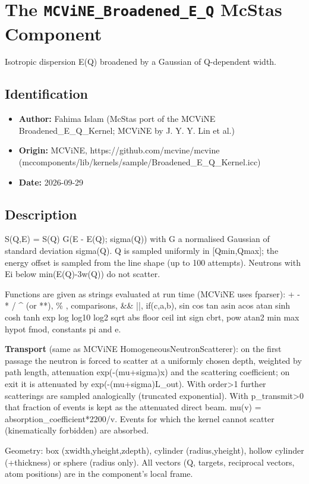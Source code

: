 \section{The \texttt{MCViNE\_Broadened\_E\_Q} McStas Component}
Isotropic dispersion E(Q) broadened by a Gaussian of Q-dependent width.

\subsection*{Identification}
\begin{itemize}
  \item \textbf{Author:} Fahima Islam (McStas port of the MCViNE Broadened\_E\_Q\_Kernel; MCViNE by J. Y. Y. Lin et al.)
  \item \textbf{Origin:} MCViNE, https://github.com/mcvine/mcvine (mccomponents/lib/kernels/sample/Broadened\_E\_Q\_Kernel.icc)
  \item \textbf{Date:} 2026-09-29
\end{itemize}

\subsection*{Description}
S(Q,E) = S(Q) G(E - E(Q); sigma(Q)) with G a normalised Gaussian of standard deviation sigma(Q). Q is sampled uniformly in [Qmin,Qmax]; the energy offset is sampled from the line shape (up to 100 attempts). Neutrons with Ei below min(E(Q)-3w(Q)) do not scatter.

Functions are given as strings evaluated at run time (MCViNE uses fparser): + - * / \textasciicircum{} (or **), \% , comparisons, \&\& ||, if(c,a,b), sin cos tan asin acos atan sinh cosh tanh exp log log10 log2 sqrt abs floor ceil int sign cbrt, pow atan2 min max hypot fmod, constants pi and e.

\textbf{Transport} (same as MCViNE HomogeneousNeutronScatterer): on the first passage the neutron is forced to scatter at a uniformly chosen depth, weighted by path length, attenuation exp(-(mu+sigma)x) and the scattering coefficient; on exit it is attenuated by exp(-(mu+sigma)L\_out). With order\textgreater{}1 further scatterings are sampled analogically (truncated exponential). With p\_transmit\textgreater{}0 that fraction of events is kept as the attenuated direct beam. mu(v) = absorption\_coefficient*2200/v. Events for which the kernel cannot scatter (kinematically forbidden) are absorbed.

Geometry: box (xwidth,yheight,zdepth), cylinder (radius,yheight), hollow cylinder (+thickness) or sphere (radius only). All vectors (Q, targets, reciprocal vectors, atom positions) are in the component's local frame.

